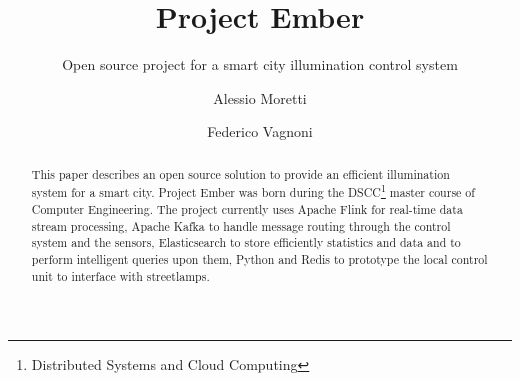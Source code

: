 \documentclass[sigconf, authordraft]{acmart}
\begin{document}
\title{Project Ember}
\subtitle{Open source project for a smart city illumination control system}

\author{Alessio Moretti}

\author{Federico Vagnoni}


\begin{abstract}
	This paper describes an open source solution to provide an efficient illumination system for a smart city. Project Ember was born during the DSCC\footnote{Distributed Systems and Cloud Computing} master course of Computer Engineering. The project currently uses Apache Flink for real-time data stream processing, Apache Kafka to handle message routing through the control system and the sensors, Elasticsearch to store efficiently statistics and data and to perform intelligent queries upon them, Python and Redis to prototype the local control unit to interface with streetlamps.
\end{abstract}


	
\maketitle
	


\nocite{*}


\end{document}
